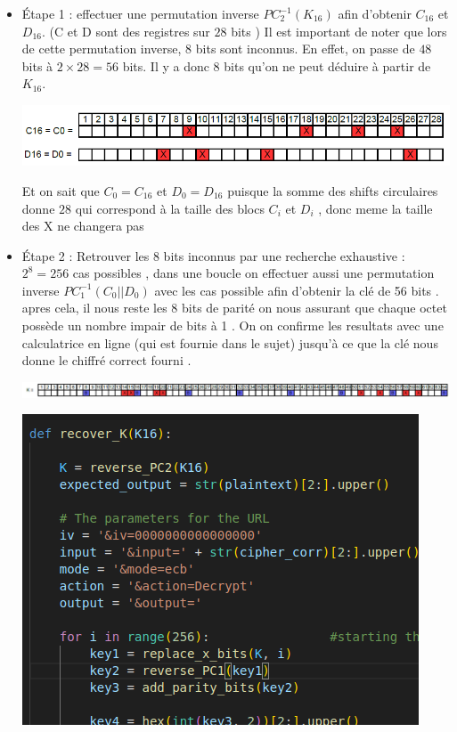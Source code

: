 \documentclass[12pt,a4paper]{report}
\begin{document}
\begin{itemize}
	\item Étape 1 : effectuer une permutation inverse $PC_{2}^{-1}(K_{16})$ afin d'obtenir $C_{16}$ et $D_{16}$.
	(C et D sont des registres sur $28$ bits ) Il est important de noter que lors de cette permutation inverse, 8 bits sont inconnus. En effet, on passe de $48$ bits à $2 \times 28 = 56$ bits. Il y a donc 8 bits qu'on ne peut déduire à partir de $K_{16}$. \newline
	
	\begin{center}\includegraphics[scale=0.4]{images/C0_D0.png}\end{center}
	
 Et on sait que $C_{0}=C_{16}$ et $D_{0}=D_{16}$ puisque la somme des shifts circulaires donne $28$ qui correspond à la taille des blocs $C_i$ et $D_i$ , donc meme la taille des X ne changera pas  \newline
	

    	\item Étape 2 : Retrouver les 8 bits inconnus par une recherche exhaustive : $2^{8}=256$ cas possibles , dans une boucle on effectuer aussi une permutation inverse $PC_{1}^{-1}(C_{0}||D_{0})$ avec les cas possible afin d'obtenir la clé de 56 bits . apres cela, il nous reste les 8 bits de parité on nous assurant que chaque octet possède un nombre impair de bits à 1 . On on confirme les resultats avec une calculatrice en ligne (qui est fournie dans le sujet) jusqu'à ce que la clé nous donne le chiffré correct fourni .
    
    \begin{center}\includegraphics[scale=0.4]{images/K_complet.png}\end{center}
    \begin{center}\includegraphics[scale=0.4]{images/boucle.png}\end{center}
     
	
\end{itemize}
\end{document}

